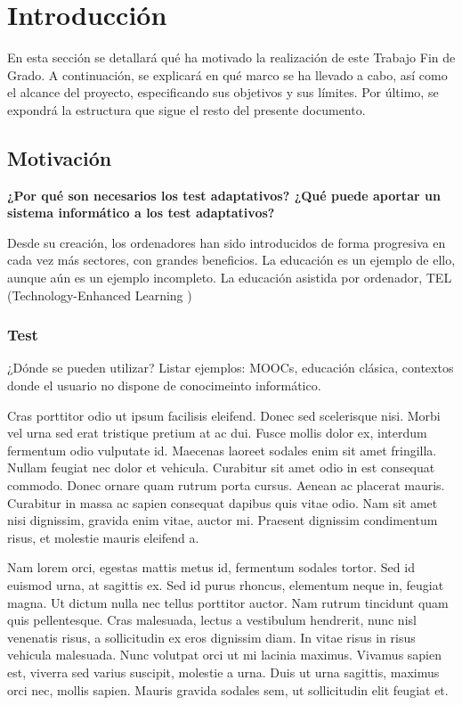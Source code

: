 \chapter{Introducción \label{sec:introduccion}}

En esta sección se detallará qué ha motivado la realización de este Trabajo Fin de Grado. A continuación, se explicará en qué marco se ha llevado a cabo, así como el alcance del proyecto, especificando sus objetivos y sus límites. Por último, se expondrá  la estructura que sigue el resto del presente documento.

\section{Motivación}

\textbf{¿Por qué son necesarios los test adaptativos?
¿Qué puede aportar un sistema informático a los test adaptativos?}

Desde su creación, los ordenadores han sido introducidos de forma progresiva en cada vez más sectores, con grandes beneficios. La educación es un ejemplo de ello, aunque aún es un ejemplo incompleto. La educación asistida por ordenador, TEL (Technology-Enhanced Learning )

\subsection{Test}
¿Dónde se pueden utilizar?
Listar ejemplos: MOOCs, educación clásica, contextos donde el usuario no dispone de conocimeinto informático.

Cras porttitor odio ut ipsum facilisis eleifend. Donec sed scelerisque nisi. Morbi vel urna sed erat tristique pretium at ac dui. Fusce mollis dolor ex, interdum fermentum odio vulputate id. Maecenas laoreet sodales enim sit amet fringilla. Nullam feugiat nec dolor et vehicula. Curabitur sit amet odio in est consequat commodo. Donec ornare quam rutrum porta cursus. Aenean ac placerat mauris. Curabitur in massa ac sapien consequat dapibus quis vitae odio. Nam sit amet nisi dignissim, gravida enim vitae, auctor mi. Praesent dignissim condimentum risus, et molestie mauris eleifend a.

Nam lorem orci, egestas mattis metus id, fermentum sodales tortor. Sed id euismod urna, at sagittis ex. Sed id purus rhoncus, elementum neque in, feugiat magna. Ut dictum nulla nec tellus porttitor auctor. Nam rutrum tincidunt quam quis pellentesque. Cras malesuada, lectus a vestibulum hendrerit, nunc nisl venenatis risus, a sollicitudin ex eros dignissim diam. In vitae risus in risus vehicula malesuada. Nunc volutpat orci ut mi lacinia maximus. Vivamus sapien est, viverra sed varius suscipit, molestie a urna. Duis ut urna sagittis, maximus orci nec, mollis sapien. Mauris gravida sodales sem, ut sollicitudin elit feugiat et.

